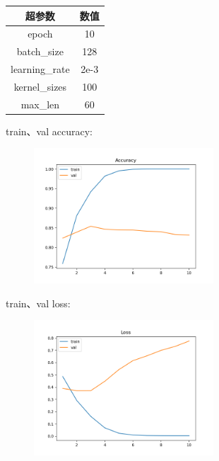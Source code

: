 \documentclass{article}
\begin{document}
\begin{table}[H]  
    \centering        
    \begin{tabular}{|c|c|}
    \hline
    {\bf 超参数} & {\bf 数值} \\
    \hline
    epoch & 10  \\
    \hline
    batch\_size & 128  \\
    \hline
    learning\_rate & 2e-3  \\
    \hline
    kernel\_sizes & 100 \\
    \hline
    max\_len & 60 \\
    \hline
    \end{tabular}
\end{table}

train、val accuracy:
\begin{figure}[h]
    \centering
    \includegraphics[width=0.6\textwidth]{../results/cnn_acc.png}
\end{figure}

\FloatBarrier

train、val loss:
\begin{figure}[h]
    \centering
    \includegraphics[width=0.6\textwidth]{../results/cnn_loss.png}
\end{figure}

\FloatBarrier
\end{document}

